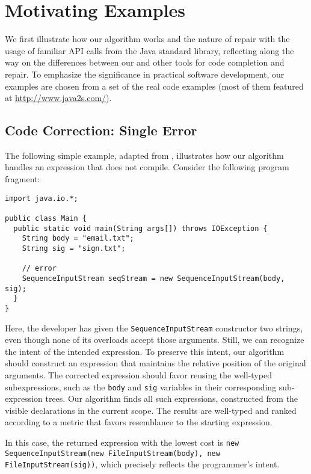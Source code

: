 \section{Motivating Examples}
\label{sec:examples}
We first illustrate how our algorithm works and the nature of repair with the usage of familiar API calls from the Java standard library, reflecting along the way on the differences between our and other tools for code completion and repair. To emphasize the significance in practical software development, our examples are chosen from a set of the real code examples (most of them featured at \url{http://www.java2s.com/}{}).

\subsection{Code Correction: Single Error}
\label{sec:examples:single}
The following simple example, adapted from \cite{GveroETAL13CompleteCompletionTypesWeights}, illustrates how our algorithm handles an expression that does not compile. Consider the following program fragment:
\begin{lstlisting}
import java.io.*;

public class Main {
  public static void main(String args[]) throws IOException {
    String body = "email.txt";
    String sig = "sign.txt";
    
    // error
    SequenceInputStream seqStream = new SequenceInputStream(body, sig);
  }
} 
\end{lstlisting}
Here, the developer has given the \lstinline{SequenceInputStream} constructor two strings, even though none of its overloads accept those arguments. Still, we can recognize the intent of the intended expression. To preserve this intent, our algorithm should construct an expression that maintains the relative position of the original arguments. The corrected expression should favor reusing the well-typed subexpressions, such as the \lstinline{body} and \lstinline{sig} variables in their corresponding sub-expression trees. Our algorithm finds all such expressions, constructed from the visible declarations in the current scope. The results are well-typed and ranked according to a metric that favors resemblance to the starting expression.

In this case, the returned expression with the lowest cost is \lstinline{new SequenceInputStream(new FileInputStream(body), new FileInputStream(sig))}, which precisely reflects the programmer's intent.

